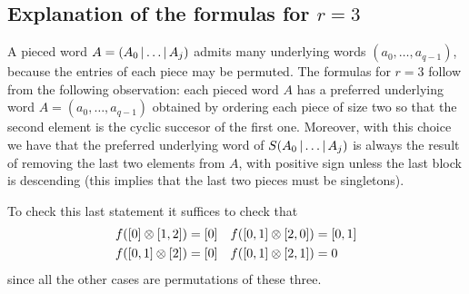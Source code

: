 \subsection{Explanation of the formulas for \texorpdfstring{$r=3$}{r = 3}} A pieced word $A = (A_0\operatorname{|}\ldots\operatorname{|} A_j)$ admits many underlying words $(a_0,\ldots,a_{q-1})$, because the entries of each piece may be permuted. The formulas for $r=3$ follow from the following observation: each pieced word $A$ has a preferred underlying word $A = (a_0,\ldots,a_{q-1})$ obtained by ordering each piece of size two so that the second element is the cyclic succesor of the first one. Moreover, with this choice we have that the preferred underlying word of $S(A_0\operatorname{|}\ldots\operatorname{|} A_{j})$ is always the result of removing the last two elements from $A$, with positive sign unless the last block is descending (this implies that the last two pieces must be singletons).

To check this last statement it suffices to check that
\begin{align*}
	f([0] \otimes  [1,2]) &= [0]
	&
	f([0,1] \otimes  [2,0]) &= [0,1]
	\\
		f([0,1] \otimes  [2]) &= [0]
	&
	f([0,1] \otimes  [2,1]) &= 0
\end{align*}
since all the other cases are permutations of these three.






